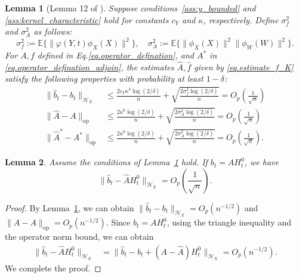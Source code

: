 \documentclass[
  12pt]{article}
\newtheorem{lemma}{Lemma}
\def\wh{\widehat}
\def\cH{\mathcal{H}}
\begin{document}
\begin{lemma}[Lemma 12 of \cite{mastouri2021proximal}]\label{Lem: rates for Khat and fhat}
Suppose conditions~\ref{ass:y_bounded} and \ref{ass:kernel_characteristic} hold for constants $c_Y$ and $\kappa$, respectively. Define $\sigma_f^2$ and $\sigma^2_A$ as follows:
\begin{equation*}
    \sigma^2_f := \mathbb{E}\{\|\varphi(Y,t)\phi_X(X)\|^2\}, \quad 
    \sigma^2_A := \mathbb{E}\{\|\phi_X(X)\|^2\|\phi_W(W)\|^2\}.
\end{equation*}
For $A, f$ defined in Eq.\eqref{eq.operator_defination}, and $A^*$ in \eqref{eq.operator_defination_adjoin}, the estimates $\wh{A}, \wh{f}$ given by \eqref{eq.estimate_f_K} satisfy the following properties with probability at least $1 - \delta$:
\begin{align*}
    \|\widehat{b}_t- b_t\|_{\cH_X}  &\leq \frac{2c_Y\kappa^3\log(2/\delta)}{n} + \sqrt{\frac{2\sigma^2_f\log(2/\delta)}{n}}=O_p\left(\frac{1}{\sqrt{n}}\right) \\
     \|\widehat{A} - A\|_{\mathrm{op}} &\leq \frac{2\kappa^6\log(2/\delta)}{n} + \sqrt{\frac{2\sigma^2_A\log(2/\delta)}{n}}=O_p\left(\frac{1}{\sqrt{n}}\right) \\
     \|\widehat{A}^* - A^*\|_{\mathrm{op}} &\leq \frac{2\kappa^6\log(2/\delta)}{n} + \sqrt{\frac{2\sigma^2_A\log(2/\delta)}{n}}=O_p\left(\frac{1}{\sqrt{n}}\right).
\end{align*}
\end{lemma}

\begin{lemma}\label{eq. f_hat-K_hatH}
Assume the conditions of Lemma~\ref{Lem: rates for Khat and fhat} hold. If $b_t=AH_{t}^0$, we have
$$
\|\widehat{b}_t - \widehat{A}H^0_t\|_{\cH_X} = O_p\left(\frac{1}{\sqrt{n}}\right).
$$
\end{lemma}
\begin{proof}
By Lemma~\ref{Lem: rates for Khat and fhat}, we can obtain $\|\widehat{b}_t-b_t\|_{\cH_X}= O_p(n^{-1/2})$ and $\|\widehat{A}-A\|_{\mathrm{op}}= O_p(n^{-1/2})$. Since $b_t = A H^0_t$, using the triangle inequality and the operator norm bound, we can obtain
\begin{align*}
    \|\widehat{b}_t-\widehat{A}H^0_t\|_{\cH_X}
    &= \|\widehat{b}_t - b_t + (A-\widehat{A})H^0_t\|_{\cH_X} = O_p(n^{-1/2}).
\end{align*}
We complete the proof. 
\end{proof}
\end{document}
